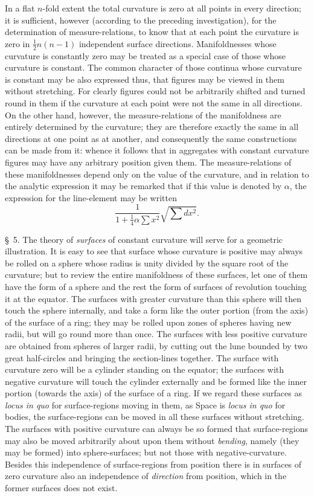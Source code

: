 \documentclass[a4paper,12pt]{article}
\begin{document}
In a flat $n$-fold extent the total curvature is zero at all
points in every direction; it is sufficient, however (according
to the preceding investigation), for the determination of
measure-relations, to know that at each point the curvature is
zero in
$\frac{1}{2} n (n - 1)$ independent surface directions.
Manifoldnesses whose curvature is constantly zero may be treated
as a special case of those whose curvature is constant.  The
common character of those continua whose curvature is constant
may be also expressed thus, that figures may be viewed in them
without stretching.  For clearly figures could not be arbitrarily
shifted and turned round in them if the curvature at each point
were not the same in all directions.  On the other hand, however,
the measure-relations of the manifoldness are entirely determined
by the curvature; they are therefore exactly the same in all
directions at one point as at another, and consequently the same
constructions can be made from it: whence it follows that in
aggregates with constant curvature figures may have any arbitrary
position given them.  The measure-relations of these
manifoldnesses depend only on the value of the curvature, and in
relation to the analytic expression it may be remarked that if
this value is denoted by $\alpha$, the expression for the
line-element may be written
\[ \frac{1}{1 + \frac{1}{4} \alpha \sum x^2}
      \sqrt{\textstyle \sum dx^2 }.\]

\bigbreak

\S~5.
The theory of \emph{surfaces} of constant curvature will
serve for a geometric illustration.  It is easy to see that
surface whose curvature is positive may always be rolled on a
sphere whose radius is unity divided by the square root of the
curvature; but to review the entire manifoldness of these
surfaces, let one of them have the form of a sphere and the rest
the form of surfaces of revolution touching it at the equator.
The surfaces with greater curvature than this sphere will then
touch the sphere internally, and take a form like the outer
portion (from the axis) of the surface of a ring; they may be
rolled upon zones of spheres having new radii, but will go round
more than once.  The surfaces with less positive curvature are
obtained from spheres of larger radii, by cutting out the lune
bounded by two great half-circles and bringing the section-lines
together.  The surface with curvature zero will be a cylinder
standing on the equator; the surfaces with negative curvature
will touch the cylinder externally and be formed like the inner
portion (towards the axis) of the surface of a ring.  If we
regard these surfaces as \emph{locus in quo} for surface-regions
moving in them, as Space is \emph{locus in quo} for bodies, the
surface-regions can be moved in all these surfaces without
stretching.  The surfaces with positive curvature can always be
so formed that surface-regions may also be moved arbitrarily
about upon them without \emph{bending}, namely (they may be
formed) into sphere-surfaces; but not those with
negative-curvature.  Besides this independence of surface-regions
from position there is in surfaces of zero curvature also an
independence of \emph{direction} from position, which in the
former surfaces does not exist.
\end{document}
